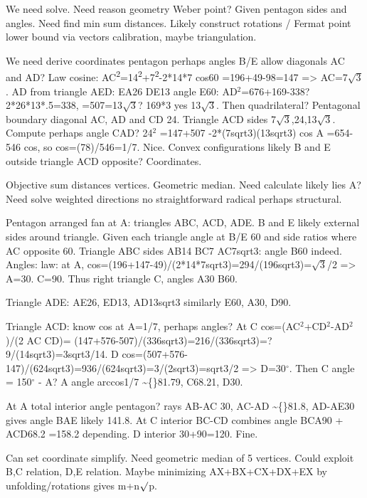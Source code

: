 \begin{decodedreasoningpanel}
  We need solve. Need reason geometry Weber point? Given pentagon sides and angles. Need find min sum distances. Likely construct rotations / Fermat point lower bound via vectors calibration, maybe triangulation.

We need derive coordinates pentagon perhaps angles B/E allow diagonals AC and AD? Law cosine:
AC\textsuperscript{2}=14\textsuperscript{2}+7\textsuperscript{2}-2*14*7 cos60 =196+49-98=147 =\textgreater{} AC=7\ensuremath{\sqrt{3}}.
AD from triangle AED: EA26 DE13 angle E60: AD\ensuremath{^2}=676+169-338? 2*26*13*.5=338, =507=13\ensuremath{\sqrt{3}}? 169*3 yes 13\ensuremath{\sqrt{3}}.
Then quadrilateral? Pentagonal boundary diagonal AC, AD and CD 24. Triangle ACD sides 7\ensuremath{\sqrt{3}},24,13\ensuremath{\sqrt{3}}. Compute perhaps angle CAD? 24\ensuremath{^2} =147+507 -2*(7sqrt3)(13sqrt3) cos A =654-546 cos, so cos=(78)/546=1/7. Nice. Convex configurations likely B and E outside triangle ACD opposite? Coordinates.

Objective sum distances vertices. Geometric median. Need calculate likely lies A? Need solve weighted directions no straightforward radical perhaps structural.

Pentagon arranged fan at A: triangles ABC, ACD, ADE. B and E likely external sides around triangle. Given each triangle angle at B/E 60 and side ratios where AC opposite 60. Triangle ABC sides AB14 BC7 AC7sqrt3: angle B60 indeed. Angles: law: at A, cos=(196+147-49)/(2*14*7sqrt3)=294/(196sqrt3)=\ensuremath{\sqrt{3}}/2 =\textgreater{} A=30. C=90. Thus right triangle C, angles A30 B60.

Triangle ADE: AE26, ED13, AD13sqrt3 similarly E60, A30, D90.

Triangle ACD: know cos at A=1/7, perhaps angles? At C cos=(AC\ensuremath{^2}+CD\ensuremath{^2}-AD\ensuremath{^2})/(2 AC CD)= (147+576-507)/(336sqrt3)=216/(336sqrt3)=? 9/(14sqrt3)=3sqrt3/14. D cos=(507+576-147)/(624sqrt3)=936/(624sqrt3)=3/(2sqrt3)=sqrt3/2 =\textgreater{} D=30\ensuremath{^\circ}. Then C angle = 150\ensuremath{^\circ} - A? A angle arccos1/7
  \textasciitilde\{\}81.79, C68.21, D30.

At A total interior angle pentagon? rays AB-AC 30, AC-AD \textasciitilde\{\}81.8, AD-AE30 gives angle BAE likely 141.8. At C interior BC-CD combines angle BCA90 + ACD68.2 =158.2 depending. D interior 30+90=120. Fine.

Can set coordinate simplify. Need geometric median of 5 vertices. Could exploit B,C relation, D,E relation. Maybe minimizing AX+BX+CX+DX+EX by unfolding/rotations gives m+n\ensuremath{\surd}p.


\end{decodedreasoningpanel}
